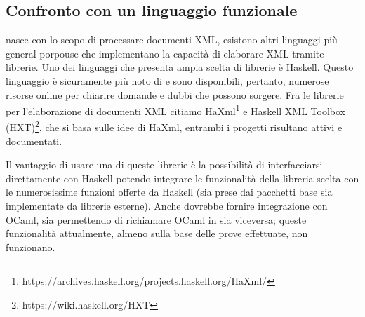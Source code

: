 \subsection{Confronto con un linguaggio funzionale}
\cduce nasce con lo scopo di processare documenti XML, esistono altri linguaggi più general porpouse che implementano la capacità di elaborare XML tramite librerie. Uno dei linguaggi che presenta ampia scelta di librerie è Haskell. Questo linguaggio è sicuramente più noto di \cduce e sono disponibili, pertanto, numerose risorse online per chiarire domande e dubbi che possono sorgere. Fra le librerie per l'elaborazione di documenti XML citiamo HaXml\footnote{https://archives.haskell.org/projects.haskell.org/HaXml/} e Haskell XML Toolbox (HXT)\footnote{https://wiki.haskell.org/HXT}, che si basa sulle idee di HaXml, entrambi i progetti risultano attivi e documentati.

Il vantaggio di usare una di queste librerie è la possibilità di interfacciarsi direttamente con Haskell potendo integrare le funzionalità della libreria scelta con le numerosissime funzioni offerte da Haskell (sia prese dai pacchetti base sia implementate da librerie esterne). Anche \cduce dovrebbe fornire integrazione con OCaml, sia permettendo di richiamare OCaml in \cduce sia viceversa; queste funzionalità attualmente, almeno sulla base delle prove effettuate, non funzionano.
